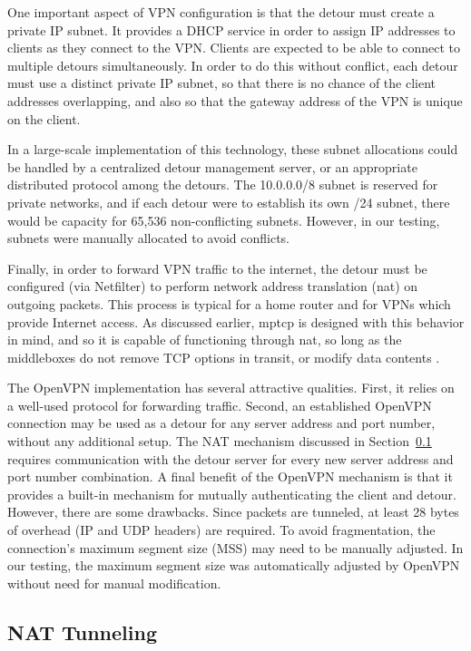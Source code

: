 \documentclass{cwru}
\begin{document}
One important aspect of VPN configuration is that the detour must create a
private IP subnet. It provides a DHCP service in order to assign IP addresses to
clients as they connect to the VPN. Clients are expected to be able to connect
to multiple detours simultaneously. In order to do this without conflict, each
detour must use a distinct private IP subnet, so that there is no chance of the
client addresses overlapping, and also so that the gateway address of the VPN is
unique on the client.

In a large-scale implementation of this technology, these subnet allocations
could be handled by a centralized detour management server, or an appropriate
distributed protocol among the detours. The 10.0.0.0/8 subnet is reserved for
private networks, and if each detour were to establish its own /24 subnet, there
would be capacity for 65,536 non-conflicting subnets. However, in our testing,
subnets were manually allocated to avoid conflicts.

Finally, in order to forward VPN traffic to the internet, the detour must be
configured (via Netfilter) to perform network address translation (\ac{nat}) on
outgoing packets. This process is typical for a home router and for VPNs which
provide Internet access. As discussed earlier, \ac{mptcp} is designed with this
behavior in mind, and so it is capable of functioning through \ac{nat}, so long
as the middleboxes do not remove TCP options in transit, or modify data contents
\cite{rfc6182}.

The OpenVPN implementation has several attractive qualities. First, it relies on
a well-used protocol for forwarding traffic. Second, an established OpenVPN
connection may be used as a detour for any server address and port number,
without any additional setup. The NAT mechanism discussed in
Section~\ref{sec:nat} requires communication with the detour server for every
new server address and port number combination. A final benefit of the OpenVPN
mechanism is that it provides a built-in mechanism for mutually authenticating
the client and detour. However, there are some drawbacks. Since packets are
tunneled, at least 28 bytes of overhead (IP and UDP headers) are required. To
avoid fragmentation, the connection's maximum segment size (MSS) may need to be
manually adjusted. In our testing, the maximum segment size was automatically
adjusted by OpenVPN without need for manual modification.

\subsection{NAT Tunneling}
\label{sec:nat}
\end{document}
